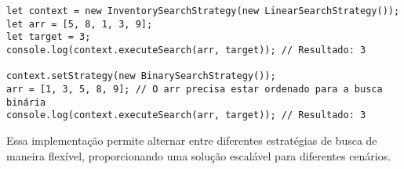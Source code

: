 \begin{verbatim}
let context = new InventorySearchStrategy(new LinearSearchStrategy());
let arr = [5, 8, 1, 3, 9];
let target = 3;
console.log(context.executeSearch(arr, target)); // Resultado: 3

context.setStrategy(new BinarySearchStrategy());
arr = [1, 3, 5, 8, 9]; // O arr precisa estar ordenado para a busca binária
console.log(context.executeSearch(arr, target)); // Resultado: 3
\end{verbatim}

Essa implementação permite alternar entre diferentes estratégias de busca de 
maneira flexível, proporcionando uma solução escalável para diferentes cenários.
